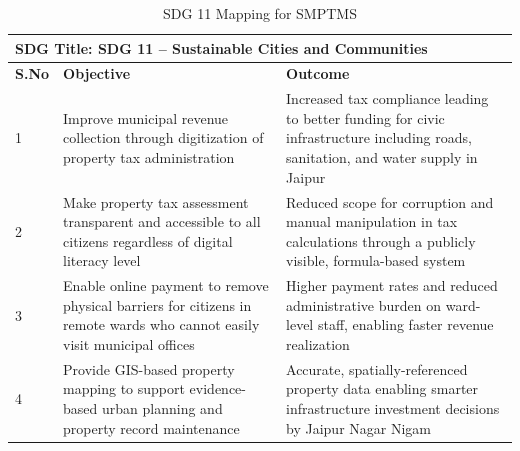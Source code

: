 \begin{table}[h]
    \begin{tabular}{|l|p{6cm}|p{8cm}|}
        \hline
        \multicolumn{3}{|l|}{\textbf{SDG Title: SDG 11 -- Sustainable Cities and Communities}} \\
        \hline
        \textbf{S.No} & \textbf{Objective} & \textbf{Outcome} \\
        \hline
        1 & Improve municipal revenue collection through digitization of property tax administration & Increased tax compliance leading to better funding for civic infrastructure including roads, sanitation, and water supply in Jaipur \\
        \hline
        2 & Make property tax assessment transparent and accessible to all citizens regardless of digital literacy level & Reduced scope for corruption and manual manipulation in tax calculations through a publicly visible, formula-based system \\
        \hline
        3 & Enable online payment to remove physical barriers for citizens in remote wards who cannot easily visit municipal offices & Higher payment rates and reduced administrative burden on ward-level staff, enabling faster revenue realization \\
        \hline
        4 & Provide GIS-based property mapping to support evidence-based urban planning and property record maintenance & Accurate, spatially-referenced property data enabling smarter infrastructure investment decisions by Jaipur Nagar Nigam \\
        \hline
    \end{tabular}
    \caption{SDG 11 Mapping for SMPTMS}
    \label{tab:sdg}
\end{table}
